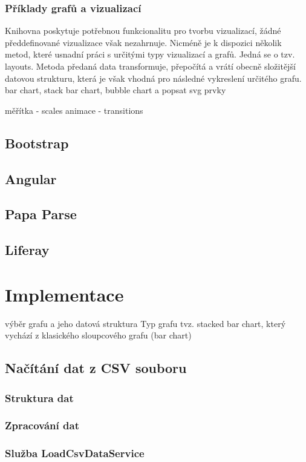 \documentclass[
  digital, %
  oneside, %
  table,   %
  nolof,     %
  nolot,     %
]{fithesis3}
\begin{document}
\subsection{Příklady grafů a vizualizací}
Knihovna poskytuje potřebnou funkcionalitu pro tvorbu vizualizací, žádné předdefinované vizualizace však nezahrnuje. Nicméně je k dispozici několik metod, které usnadní práci s určitými typy vizualizací a grafů. Jedná se o tzv. layouts. Metoda předaná data transformuje, přepočítá a vrátí obecně složitější datovou strukturu, která je však vhodná pro následné vykreslení určitého grafu.
bar chart, stack bar chart, bubble chart a popsat svg prvky


měřítka - scales
animace - transitions

\section{Bootstrap}
\section{Angular}
\section{Papa Parse}
\section{Liferay}

\chapter{Implementace}
výběr grafu a jeho datová struktura
Typ grafu tvz. stacked bar chart, který vychází z klasického sloupcového grafu (bar chart)

\section{Načítání dat z CSV souboru}
\subsection{Struktura dat}
\subsection{Zpracování dat}
\subsection{Služba LoadCsvDataService}
\end{document}
